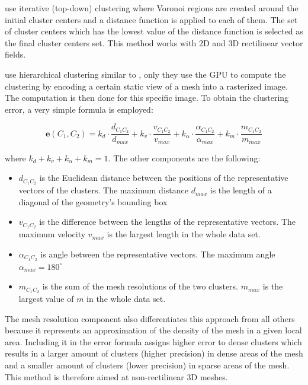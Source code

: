 \citet{Du04} use iterative (top-down) clustering where Voronoi regions are created around the initial cluster centers and a distance function is applied to each of them. The set of cluster centers which has the lowest value of the distance function is selected as the final cluster centers set. This method works with 2D and 3D rectilinear vector fields.

\citet{Peng12} use hierarchical clustering similar to \citet{Telea99}, only they use the GPU to compute the clustering by encoding a certain static view of a mesh into a rasterized image. The computation is then done for this specific image. To obtain the clustering error, a very simple formula is employed:

\begin{equation} \label{eq:clustering_error}
\bm{e}(C_1,C_2) = k_d \cdot \frac{d_{C_1C_2}}{d_{max}} + k_v \cdot \frac{v_{C_1C_2}}{v_{max}} + k_\alpha \cdot \frac{\alpha_{C_1C_2}}{\alpha_{max}} + k_m \cdot \frac{m_{C_1C_2}}{m_{max}}
\end{equation}

where \(k_d + k_v + k_\alpha + k_m = 1\). The other components are the following:

\begin{itemize}
\item \(d_{C_1C_2}\) is the Euclidean distance between the positions of the representative vectors of the clusters. The maximum distance \(d_{max}\) is the length of a diagonal of the geometry's bounding box
\item \(v_{C_1C_2}\) is the difference between the lengths of the representative vectors. The maximum velocity \(v_{max}\) is the largest length in the whole data set.
\item \(\alpha_{C_1C_2}\) is angle between the representative vectors. The maximum angle \(\alpha_{max} = 180^\circ\)
\item \(m_{C_1C_2}\) is the sum of the mesh resolutions of the two clusters. \(m_{max}\) is the largest value of \(m\) in the whole data set.
\end{itemize}

The mesh resolution component also differentiates this approach from all others because it represents an approximation of the density of the mesh in a given local area. Including it in the error formula assigns higher error to dense clusters which results in a larger amount of clusters (higher precision) in dense areas of the mesh and a smaller amount of clusters (lower precision) in sparse areas of the mesh. This method is therefore aimed at non-rectilinear 3D meshes.

